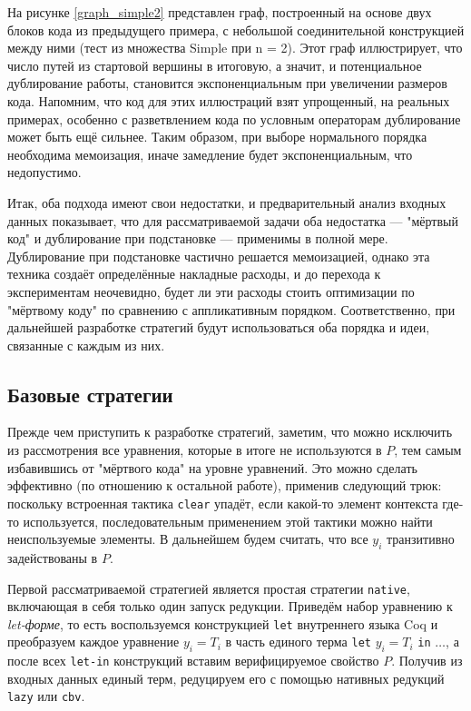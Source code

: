 \documentclass[../diploma.tex]{subfiles}
\begin{document}
На рисунке \ref{graph_simple2} представлен граф, построенный на основе двух блоков кода из предыдущего примера, с небольшой соединительной конструкцией между ними (тест из множества Simple при n = 2). Этот граф иллюстрирует, что число путей из стартовой вершины в итоговую, а значит, и потенциальное дублирование работы, становится экспоненциальным при увеличении размеров кода. Напомним, что код для этих иллюстраций взят упрощенный, на реальных примерах, особенно с разветвлением кода по условным операторам дублирование может быть ещё сильнее. Таким образом, при выборе нормального порядка необходима мемоизация, иначе замедление будет экспоненциальным, что недопустимо.

Итак, оба подхода имеют свои недостатки, и предварительный анализ входных данных показывает, что для рассматриваемой задачи оба недостатка --- "мёртвый код" и дублирование при подстановке --- применимы в полной мере. Дублирование при подстановке частично решается мемоизацией, однако эта техника создаёт определённые накладные расходы, и до перехода к экспериментам неочевидно, будет ли эти расходы стоить оптимизации по "мёртвому коду" по сравнению с аппликативным порядком. Соответственно, при дальнейшей разработке стратегий будут использоваться оба порядка и идеи, связанные с каждым из них.

\subsection{Базовые стратегии}

Прежде чем приступить к разработке стратегий, заметим, что можно исключить из рассмотрения все уравнения, которые в итоге не используются в $P$, тем самым избавившись от "мёртвого кода" на уровне уравнений. Это можно сделать эффективно (по отношению к остальной работе), применив следующий трюк: поскольку встроенная тактика \texttt{clear} упадёт, если какой-то элемент контекста где-то используется, последовательным применением этой тактики можно найти неиспользуемые элементы. В дальнейшем будем считать, что все $y_i$ транзитивно задействованы в $P$.

Первой рассматриваемой стратегией является простая стратегии \texttt{native}, включающая в себя только один запуск редукции. Приведём набор уравнению к \textit{let-форме}, то есть воспользуемся конструкцией \texttt{let} внутреннего языка Coq и преобразуем каждое уравнение $y_i = T_i$ в часть единого терма \texttt{let} $y_i = T_i$ \texttt{in} $\dots$, а после всех \texttt{let-in} конструкций вставим верифицируемое свойство $P$. Получив из входных данных единый терм, редуцируем его с помощью нативных редукций \texttt{lazy} или \texttt{cbv}.
\end{document}
